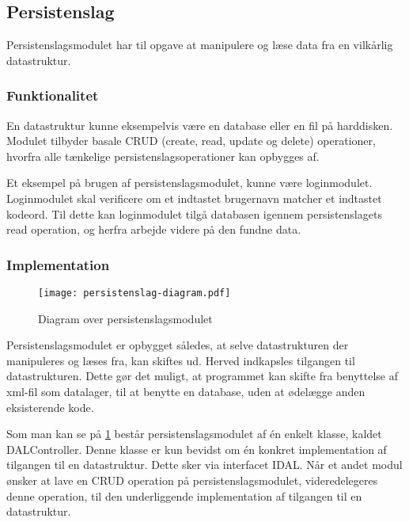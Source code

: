 \subsection{Persistenslag}
\label{sub:persistenslag}

Persistenslagsmodulet har til opgave at manipulere og læse data fra en vilkårlig datastruktur.

\subsubsection{Funktionalitet}
\label{ssub:persistenslag_funktionalitet}

En datastruktur kunne eksempelvis være en database eller en fil på harddisken. Modulet tilbyder basale CRUD (create, read, update og delete) operationer, hvorfra alle tænkelige persistenslagsoperationer kan opbygges af.

Et eksempel på brugen af persistenslagsmodulet, kunne være loginmodulet. Loginmodulet skal verificere om et indtastet brugernavn matcher et indtastet kodeord. Til dette kan loginmodulet tilgå databasen igennem persistenslagets read operation, og herfra arbejde videre på den fundne data.

\subsubsection{Implementation}
\label{ssub:persistenslag_implementation}
\begin{figure}
  \centering
  \texttt{[image: persistenslag-diagram.pdf]}
  \caption{Diagram over persistenslagsmodulet}
  \label{fig:permod}
\end{figure}

Persistenslagsmodulet er opbygget således, at selve datastrukturen der manipuleres og læses fra, kan skiftes ud. Herved indkapsles tilgangen til datastrukturen. Dette gør det muligt, at programmet kan skifte fra benyttelse af xml-fil som datalager, til at benytte en database, uden at ødelægge anden eksisterende kode.

Som man kan se på \cref{fig:permod} består persistenslagsmodulet af én enkelt klasse, kaldet DALController. Denne klasse er kun bevidst om én konkret implementation af tilgangen til en datastruktur. Dette sker via interfacet IDAL. Når et andet modul ønsker at lave en CRUD operation på persistenslagsmodulet, videredelegeres denne operation, til den underliggende implementation af tilgangen til en datastruktur.
